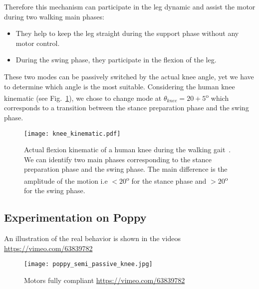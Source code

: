 Therefore this mechanism can participate in the leg dynamic and assist the motor during two walking main phases:
\begin{itemize}
    \item They help to keep the leg straight during the support phase without any motor control.
    \item During the swing phase, they participate in the flexion of the leg.
\end{itemize}

These two modes can be passively switched by the actual knee angle, yet we have to determine which angle is the most suitable. Considering the human knee kinematic (see Fig.~\ref{fig:human_knee_kinematic}), we chose to change mode at $\theta_{knee} = 20+5$\textsuperscript{o}  which corresponds to a transition between the stance preparation phase and the swing phase.

\begin{figure}[thpb]
    \centering
    \texttt{[image: knee\_kinematic.pdf]}
    \caption{Actual flexion kinematic of a human knee during the walking gait~\parencite{Nester2003}. We can identify two main phases corresponding to the stance preparation phase and the swing phase. The main difference is the amplitude of the motion i.e $<20$\textsuperscript{o}  for the stance phase and $>20$\textsuperscript{o} for the swing phase.}
    \label{fig:human_knee_kinematic}
\end{figure}


\subsection{Experimentation on Poppy} %

An illustration of the real behavior is shown in the videos \url{https://vimeo.com/63839782}

\begin{figure}[ht]
    \begin{center}
        \texttt{[image: poppy\_semi\_passive\_knee.jpg]}
    \end{center}
    \caption{}

\end{figure}


\begin{figure}[!ht]
\centering
    \hfil
    \caption{Motors fully compliant \url{https://vimeo.com/63839782}}

\end{figure}




